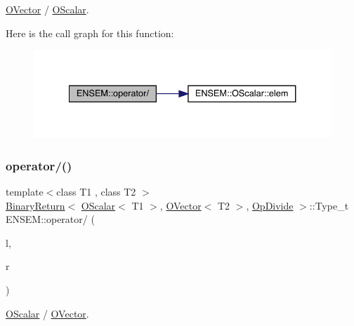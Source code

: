 \mbox{\hyperlink{classENSEM_1_1OVector}{O\+Vector}} / \mbox{\hyperlink{classENSEM_1_1OScalar}{O\+Scalar}}. 

Here is the call graph for this function\+:\nopagebreak
\begin{figure}[H]
\begin{center}
\leavevmode
\includegraphics[width=334pt]{da/d59/group__obsvector_ga7000d5ea0ebcbe74abe855326d6e82cd_cgraph}
\end{center}
\end{figure}
\mbox{\label{group__obsvector_gaf4f1f6a048cad788e11294a211380fab}} 
\subsubsection{\texorpdfstring{operator/()}{operator/()}\hspace{0.1cm}{\footnotesize\ttfamily [3/3]}}
{\footnotesize\ttfamily template$<$class T1 , class T2 $>$ \\
\mbox{\hyperlink{structENSEM_1_1BinaryReturn}{Binary\+Return}}$<$ \mbox{\hyperlink{classENSEM_1_1OScalar}{O\+Scalar}}$<$ T1 $>$, \mbox{\hyperlink{classENSEM_1_1OVector}{O\+Vector}}$<$ T2 $>$, \mbox{\hyperlink{structENSEM_1_1OpDivide}{Op\+Divide}} $>$\+::Type\+\_\+t E\+N\+S\+E\+M\+::operator/ (\begin{DoxyParamCaption}\item[{const \mbox{\hyperlink{classENSEM_1_1OScalar}{O\+Scalar}}$<$ T1 $>$ \&}]{l,  }\item[{const \mbox{\hyperlink{classENSEM_1_1OVector}{O\+Vector}}$<$ T2 $>$ \&}]{r }\end{DoxyParamCaption})\hspace{0.3cm}{\ttfamily [inline]}}



\mbox{\hyperlink{classENSEM_1_1OScalar}{O\+Scalar}} / \mbox{\hyperlink{classENSEM_1_1OVector}{O\+Vector}}. 

